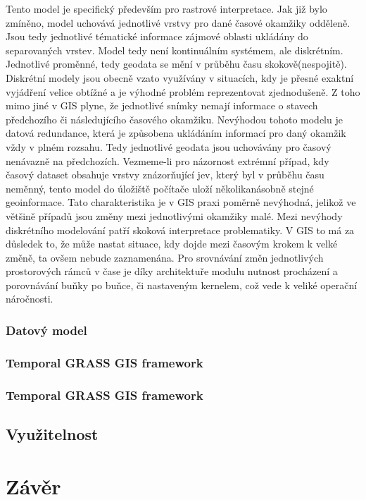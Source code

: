 \documentclass[a4paper,12pt]{article}
\begin{document}
Tento model je specifický především pro rastrové interpretace. Jak již bylo zmíněno, model uchovává jednotlivé vrstvy pro dané časové okamžiky odděleně. Jsou tedy jednotlivé tématické informace zájmové oblasti ukládány do separovaných vrstev. Model tedy není kontinuálním systémem, ale diskrétním. Jednotlivé proměnné, tedy geodata se mění v průběhu času skokově(nespojitě). Diskrétní modely jsou obecně vzato využívány v situacích, kdy je přesné exaktní vyjádření velice obtížné a je výhodné problém reprezentovat zjednodušeně. Z toho mimo jiné v GIS plyne, že jednotlivé snímky nemají informace o stavech  předchozího či následujícího časového okamžiku.
Nevýhodou tohoto modelu je datová redundance, která je způsobena ukládáním informací pro daný okamžik vždy v plném rozsahu. Tedy jednotlivé geodata jsou uchovávány pro časový nenávazně na předchozích. Vezmeme-li pro názornost extrémní případ, kdy časový dataset obsahuje vrstvy znázorňující jev, který byl v průběhu času neměnný, tento model do úložiště počítače uloží několikanásobně stejné geoinformace. Tato charakteristika je v GIS praxi poměrně nevýhodná, jelikož ve většině případů jsou změny mezi jednotlivými okamžiky malé.
Mezi nevýhody diskrétního modelování patří skoková interpretace problematiky. V GIS to má za důsledek to, že může nastat situace, kdy dojde mezi časovým krokem k velké změně, ta ovšem nebude zaznamenána.
Pro srovnávání změn jednotlivých prostorových rámců v čase je díky architektuře modulu nutnost procházení a porovnávání buňky po buňce, či nastaveným kernelem, což vede k veliké operační náročnosti.

 

\subsubsection{Datový model}

\subsubsection{Temporal GRASS GIS framework}
\subsubsection{Temporal GRASS GIS framework}


\subsection{Využitelnost}
\setcounter{footnote}{1}
\section{Závěr}
\end{document}

